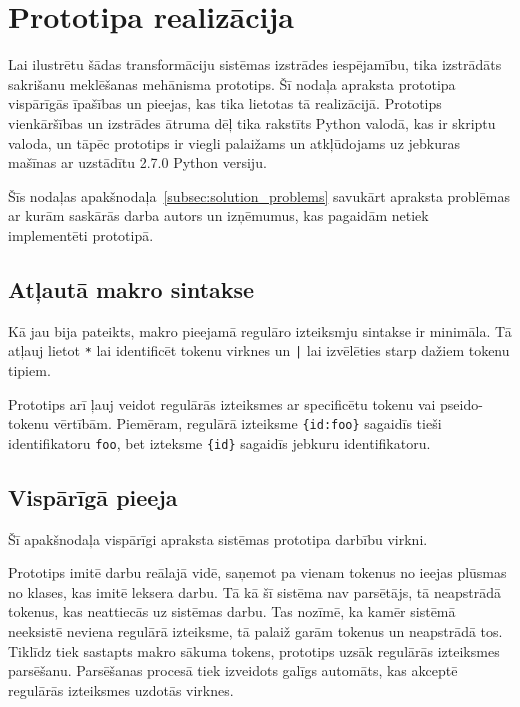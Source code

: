 \section{Prototipa realizācija}


Lai ilustrētu šādas transformāciju sistēmas izstrādes iespējamību, tika izstrādāts sakrišanu meklēšanas mehānisma prototips. Šī nodaļa apraksta prototipa vispārīgās īpašības un pieejas, kas tika lietotas tā realizācijā. Prototips vienkāršības un izstrādes ātruma dēļ tika rakstīts Python valodā, kas ir skriptu valoda, un tāpēc prototips ir viegli palaižams un atkļūdojams uz jebkuras mašīnas ar uzstādītu 2.7.0 Python versiju.

Šīs nodaļas apakšnodaļa~\ref{subsec:solution_problems} savukārt apraksta problēmas ar kurām saskārās darba autors un izņēmumus, kas pagaidām netiek implementēti prototipā.


\subsection{\label{subsec:solution_syntax}Atļautā makro sintakse}

Kā jau bija pateikts, makro pieejamā regulāro izteiksmju sintakse ir minimāla. Tā atļauj lietot \verb|*| lai identificēt tokenu virknes un \verb/|/ lai izvēlēties starp dažiem tokenu tipiem.

Prototips arī ļauj veidot regulārās izteiksmes ar specificētu tokenu vai pseido-tokenu vērtībām. Piemēram, regulārā izteiksme \verb|{id:foo}| sagaidīs tieši identifikatoru \verb|foo|, bet izteksme \verb|{id}| sagaidīs jebkuru identifikatoru.

\subsection{\label{subsec:solution_approach}Vispārīgā pieeja}
Šī apakšnodaļa vispārīgi apraksta sistēmas prototipa darbību virkni.

Prototips imitē darbu reālajā vidē, saņemot pa vienam tokenus no ieejas plūsmas no klases, kas imitē leksera darbu. Tā kā šī sistēma nav parsētājs, tā neapstrādā tokenus, kas neattiecās uz sistēmas darbu. Tas nozīmē, ka kamēr sistēmā neeksistē neviena regulārā izteiksme, tā palaiž garām tokenus un neapstrādā tos. Tiklīdz tiek sastapts makro sākuma tokens, prototips uzsāk regulārās izteiksmes parsēšanu. Parsēšanas procesā tiek izveidots galīgs automāts, kas akceptē regulārās izteiksmes uzdotās virknes.

